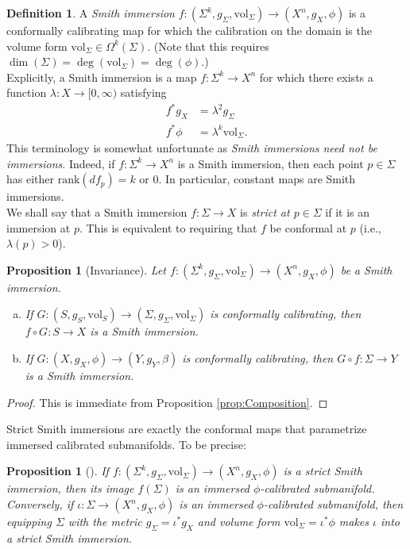 \documentclass[11pt]{article}
\newcommand{\vol}{\mathrm{vol}}
\newtheorem{prop}[thm]{Proposition}
\theoremstyle{definition}
\newtheorem{defn}[thm]{Definition}
\numberwithin{equation}{section}
\begin{document}
 \begin{defn} A \emph{Smith immersion} $f \colon (\Sigma^k, g_\Sigma, \vol_\Sigma) \to (X^n, g_X, \phi)$ is a conformally calibrating map for which the calibration on the domain is the volume form $\vol_\Sigma \in \Omega^k(\Sigma)$.  (Note that this requires $\dim(\Sigma) = \deg(\vol_\Sigma) = \deg(\phi)$.) \\
 \indent Explicitly, a Smith immersion is a map $f \colon \Sigma^k \to X^n$ for which there exists a function $\lambda \colon X \to [0,\infty)$ satisfying
\begin{align*}
f^*g_X & = \lambda^2 g_\Sigma \\
f^*\phi & = \lambda^k \vol_\Sigma.
\end{align*}
This terminology is somewhat unfortunate as \emph{Smith immersions need not be immersions}.  Indeed, if $f \colon \Sigma^k \to X^n$ is a Smith immersion, then each point $p \in \Sigma$ has either $\mathrm{rank}(df_p) = k$ or $0$.  In particular, constant maps are Smith immersions. \\
\indent We shall say that a Smith immersion $f \colon \Sigma \to X$ is \emph{strict at $p \in \Sigma$} if it is an immersion at $p$.  This is equivalent to requiring that $f$ be conformal at $p$ (i.e., $\lambda(p) > 0$).
 \end{defn}
 
  \begin{prop}[Invariance]\label{prop:Invariance} Let $f \colon (\Sigma^k, g_\Sigma, \vol_\Sigma) \to (X^n, g_X, \phi)$ be a Smith immersion.
 \begin{enumerate}[(a)]
 \item If $G \colon (S, g_S, \vol_S) \to (\Sigma, g_\Sigma, \vol_\Sigma)$ is conformally calibrating, then $f \circ G \colon S \to X$ is a Smith immersion.
  \item If $G \colon (X, g_X, \phi) \to (Y, g_Y, \beta)$ is conformally calibrating, then $G \circ f \colon \Sigma \to Y$ is a Smith immersion.
  \end{enumerate}
 \end{prop}
  
  \begin{proof} This is immediate from Proposition \ref{prop:Composition}.
  \end{proof}


\indent Strict Smith immersions are exactly the conformal maps that parametrize immersed calibrated submanifolds.  To be precise:
   
 \begin{prop}[\cite{cheng2021bubble}] \label{prop:SmithParamSub} If $f \colon (\Sigma^k, g_\Sigma, \vol_\Sigma) \to (X^n, g_X, \phi)$ is a strict Smith immersion, then its image $f(\Sigma)$ is an immersed $\phi$-calibrated submanifold.  Conversely, if $\iota \colon \Sigma \to (X^n, g_X, \phi)$ is an immersed $\phi$-calibrated submanifold, then equipping $\Sigma$ with the metric $g_\Sigma = \iota^*g_X$ and volume form $\vol_\Sigma = \iota^*\phi$ makes $\iota$ into a strict Smith immersion.
 \end{prop}
 
\end{document}
